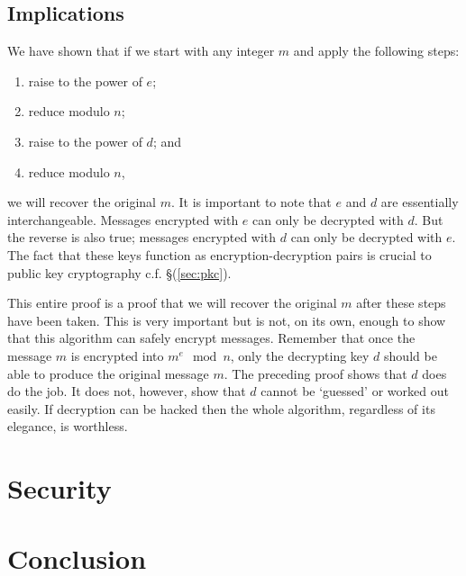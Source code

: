 \documentclass[]{scrartcl}
\theoremstyle{definition}
\renewcommand{\sec}[1]{\S \ref{#1}}
\let\oldref\ref
\renewcommand{\ref}[1]{(\oldref{#1})}
\begin{document}
\subsection{Implications}
We have shown that if we start with any integer $m$ and apply the following steps:
\begin{enumerate}
    \item raise to the power of $e$;
    \item reduce modulo $n$;
    \item raise to the power of $d$; and
    \item reduce modulo $n$,
\end{enumerate}
we will recover the original $m$. It is important to note that $e$ and $d$ are essentially interchangeable. Messages encrypted with $e$ can only be decrypted with $d$. But the reverse is also true; messages encrypted with $d$ can only be decrypted with $e$. The fact that these keys function as encryption-decryption pairs is crucial to public key cryptography c.f. \sec{sec:pkc}.

This entire proof is a proof that we will recover the original $m$ after these steps have been taken. This is very important but is not, on its own, enough to show that this algorithm can safely encrypt messages. Remember that once the message $m$ is encrypted into $m^e \mod n$, only the decrypting key $d$ should be able to produce the original message $m$. The preceding proof shows that $d$ does do the job. It does not, however, show that $d$ cannot be `guessed' or worked out easily. If decryption can be hacked then the whole algorithm, regardless of its elegance, is worthless.

\section{Security}

\section{Conclusion}
\end{document}
